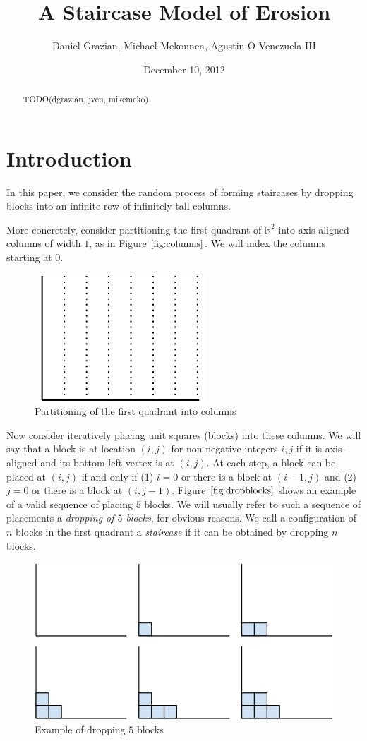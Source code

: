 \documentclass[12pt]{amsart}
\title{A Staircase Model of Erosion}
\author{Daniel Grazian, Michael Mekonnen, Agustin O Venezuela III}
\date{December 10, 2012}
\newcommand{\R}{\mathbb{R}}
\newcommand{\newfigure}[3]{
\begin{figure}
#3
\caption{#2 \label{#1}}
\end{figure}
}
\newcommand{\newsection}[2]{
\section{#1 \label{#2}}
}
\begin{document}
\begin{abstract}
TODO(dgrazian, jven, mikemeko)
\end{abstract}

\maketitle

\newsection{Introduction}{sec:intro}
In this paper, we consider the random process of forming staircases by dropping blocks into an infinite row of infinitely tall columns.

More concretely, consider partitioning the first quadrant of $\R^2$ into axis-aligned columns of width $1$, as in Figure $\ref{fig:columns}$. We will index the columns starting at $0$.

\newfigure{fig:columns}{Partitioning of the first quadrant into columns}{
\includegraphics[scale=0.4]{columns_fig.png}
}

Now consider iteratively placing unit squares (blocks) into these columns. We will say that a block is at location $(i, j)$ for non-negative integers $i, j$ if it is axis-aligned and its bottom-left vertex is at $(i, j)$. At each step, a block can be placed at $(i, j)$ if and only if (1) $i = 0$ or there is a block at $(i - 1, j)$ and (2) $j = 0$ or there is a block at $(i, j - 1)$. Figure $\ref{fig:dropblocks}$ shows an example of a valid sequence of placing $5$ blocks. We will usually refer to such a sequence of placements a \textit{dropping of $5$ blocks}, for obvious reasons. We call a configuration of $n$ blocks in the first quadrant a \textit{staircase} if it can be obtained by dropping $n$ blocks.

\newfigure{fig:dropblocks}{Example of dropping $5$ blocks}{
\includegraphics[scale=0.4]{dropblocks_fig.png}
}
\end{document}
